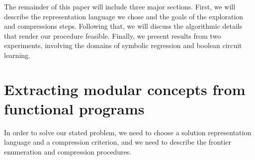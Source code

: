 \documentclass{article}
\begin{document}
The remainder of this paper will include three major sections. First,
we will describe the representation language we chose and the goals of
the exploration and compressions steps. Following that, we will
discuss the algorithmic details that render our procedure
feasible. Finally, we present results from two experiments, involving
the domains of symbolic regression and boolean circuit learning.






\section{Extracting modular concepts from functional programs}

In order to solve our stated problem, we need to choose a solution
representation language and a compression criterion, and we need to
describe the frontier enumeration and compression procedures.
\end{document}
